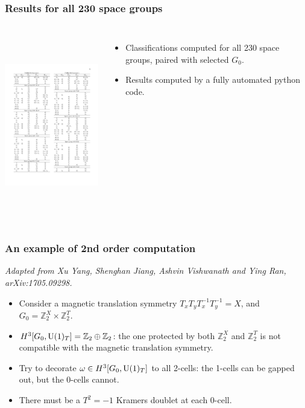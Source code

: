 \documentclass[xcolor=table, aspectratio=43,ignorenonframetext]{beamer}
\newcommand{\uone}{\text U(1)}
\begin{document}
\begin{frame}
	\frametitle{Results for all 230 space groups}
	\begin{columns}
		\includegraphics[height=8cm]{../spspt/bigtable}
		\begin{itemize}
			\item Classifications computed for all 230 space groups, paired with selected $G_0$.
			\item Results computed by a fully automated python code.
		\end{itemize}
	\end{columns}
\end{frame}

\begin{frame}
\frametitle{An example of 2nd order computation}
\emph{\small Adapted from Xu Yang, Shenghan Jiang, Ashvin Vishwanath and Ying Ran, arXiv:1705.09298.}
\begin{itemize}
	\item Consider a magnetic translation symmetry $T_xT_yT_x^{-1}T_y^{-1} = X$, and $G_0=\mathbb Z_2^X\times\mathbb Z_2^T$.
	\item $H^3[G_0,\uone_T]=\mathbb Z_2\oplus\mathbb Z_2$: the one protected by both $\mathbb Z_2^X$ and $\mathbb Z_2^T$ is \alert{not compatible} with the magnetic translation symmetry.
	\item Try to decorate $\omega\in H^3[G_0,\uone_T]$ to all 2-cells: the 1-cells can be gapped out, but the 0-cells \alert{cannot}.
	\item There must be a $T^2=-1$ Kramers doublet at each 0-cell.
\end{itemize}
\begin{center}
\end{center}
\end{frame}
\end{document}
